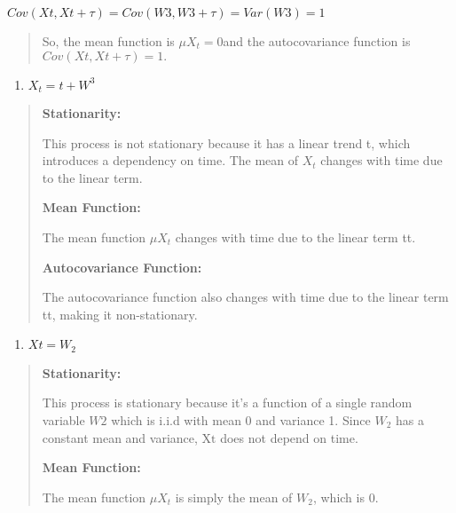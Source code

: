 \documentclass{article}
\begin{document}
\begin{enumerate}
    $Cov(Xt,Xt + \tau) = Cov(W3,W3 + \tau) = Var(W3) = 1$

    \begin{quote}
    So, the mean function is \(\mu X_{t} = 0\)and the autocovariance
    function is \(Cov(Xt,Xt + \tau) = 1.\)
    \end{quote}

    \begin{enumerate}
    \def\labelenumi{\alph{enumi}.}
    \setcounter{enumi}{1}
    \item
    \(X_{t} = t + W^{3}\)
    \end{enumerate}

    \begin{quote}
    \textbf{Stationarity:}

    This process is not stationary because it has a linear trend t, which
    introduces a dependency on time. The mean of \(X_{t}\) changes with time
    due to the linear term.

    \textbf{Mean Function:}

    The mean function \(\mu X_{t}\)\hspace{0pt}\hspace{0pt} changes with
    time due to the linear term tt.

    \textbf{Autocovariance Function:}

    The autocovariance function also changes with time due to the linear
    term tt, making it non-stationary.
    \end{quote}

    \begin{enumerate}
    \def\labelenumi{\alph{enumi}.}
    \setcounter{enumi}{2}
    \item
    \(Xt = W_{2}\)
    \end{enumerate}

    \begin{quote}
    \textbf{Stationarity:}

    This process is stationary because it's a function of a single random
    variable \(W2\) which is i.i.d with mean 0 and variance 1. Since
    \(W_{2}\)\hspace{0pt} has a constant mean and variance,
    \(\text{Xt}\)\hspace{0pt} does not depend on time.

    \textbf{Mean Function:}

    The mean function \(\mu X_{t}\)\hspace{0pt}\hspace{0pt} is simply the
    mean of \(W_{2}\)\hspace{0pt}, which is 0.


\end{quote}
\end{enumerate}
\end{document}
